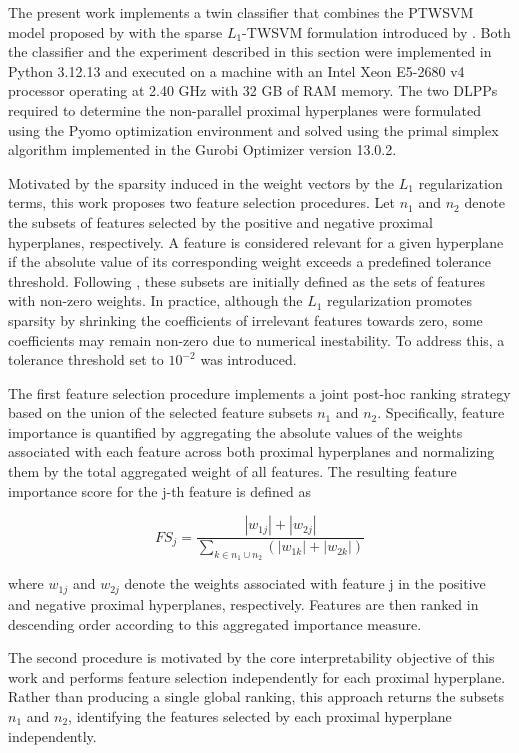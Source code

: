 \documentclass[12pt]{report} %
\begin{document}
The present work implements a twin classifier that combines the PTWSVM model proposed by \cite{shao2012probabilistic} with the sparse $L_1$-TWSVM formulation introduced by \cite{bai2014novel}. Both the classifier and the experiment described in this section were implemented in Python 3.12.13 and executed on a machine with an Intel Xeon E5-2680 v4 processor operating at 2.40 GHz with 32 GB of RAM memory. The two DLPPs required to determine the non-parallel proximal hyperplanes were formulated using the Pyomo optimization environment and solved using the primal simplex algorithm implemented in the Gurobi Optimizer version 13.0.2.

Motivated by the sparsity induced in the weight vectors by the $L_1$ regularization terms, this work proposes two feature selection procedures. Let $n_1$ and $n_2$ denote the subsets of features selected by the positive and negative proximal hyperplanes, respectively. A feature is considered relevant for a given hyperplane if the absolute value of its corresponding weight exceeds a predefined tolerance threshold. Following \cite{bai2014novel}, these subsets are initially defined as the sets of features with non-zero weights. In practice, although the $L_1$ regularization promotes sparsity by shrinking the coefficients of irrelevant features towards zero, some coefficients may remain non-zero due to numerical inestability. To address this, a tolerance threshold set to $10^{-2}$ was introduced.

The first feature selection procedure implements a joint post-hoc ranking strategy based on the union of the selected feature subsets $n_1$ and $n_2$. Specifically, feature importance is quantified by aggregating the absolute values of the weights associated with each feature across both proximal hyperplanes and normalizing them by the total aggregated weight of all features. The resulting feature importance score for the j-th feature is defined as

\begin{equation}
\label{eq:feature_importance}
FS_j = \frac{|w_{1j}| + |w_{2j}|}{\sum_{k\in n_1 \cup n_2} (|w_{1k}| + |w_{2k}|)}
\end{equation}

where $w_{1j}$ and $w_{2j}$ denote the weights associated with feature j in the positive and negative proximal hyperplanes, respectively. Features are then ranked in descending order according to this aggregated importance measure.

The second procedure is motivated by the core interpretability objective of this work and performs feature selection independently for each proximal hyperplane. Rather than producing a single global ranking, this approach returns the subsets $n_1$ and $n_2$, identifying the features selected by each proximal hyperplane independently.
\end{document}
